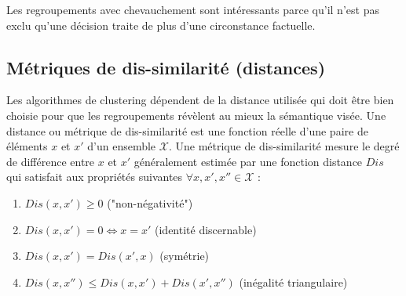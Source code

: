  Les regroupements avec chevauchement sont intéressants parce qu'il n'est pas exclu qu'une décision traite de plus d'une circonstance factuelle.



\subsection{Métriques de dis-similarité (distances)}
\label{sec:similarite:distances}
Les algorithmes de clustering dépendent de la distance utilisée qui doit être bien choisie pour que les regroupements révèlent au mieux la sémantique visée. Une distance ou métrique de dis-similarité est une fonction réelle d'une paire de éléments $x$ et $x'$ d'un ensemble $\mathcal{X}$. Une métrique de dis-similarité mesure le degré de différence entre $x$ et $x'$  généralement estimée par une fonction distance $Dis$  qui satisfait aux propriétés suivantes $\forall x,x',x'' \in \mathcal{X}$ \citep{wang2015distancemetriclearningsurvey}:
\begin{enumerate}
\item $Dis(x,x') \geq 0$ ("non-négativité")
\item $Dis(x,x') = 0  \Leftrightarrow x = x'$ (identité discernable)
\item $Dis(x,x') = Dis(x', x)$ (symétrie)
\item $Dis(x,x'') \leq Dis(x,x') + Dis(x',x'')$ (inégalité triangulaire) \label{enum:sim:ineq-tri}
\end{enumerate}


